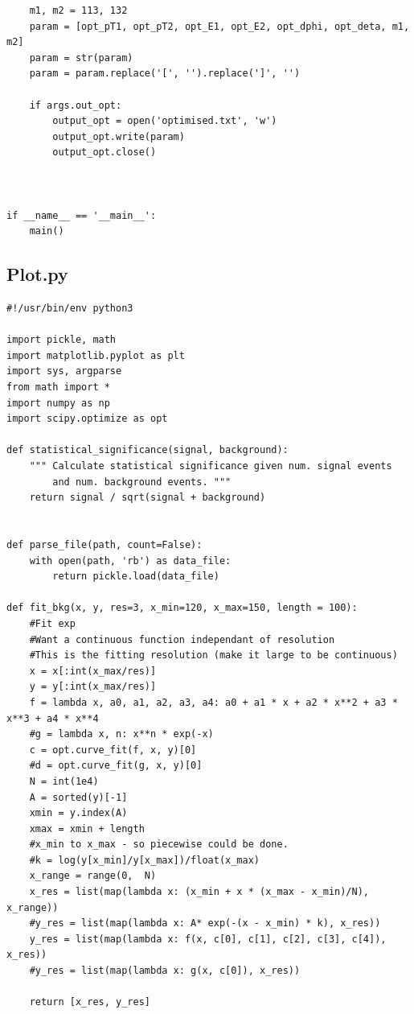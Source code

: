 \documentclass{article}
\begin{document}
\begin{lstlisting}
    m1, m2 = 113, 132
    param = [opt_pT1, opt_pT2, opt_E1, opt_E2, opt_dphi, opt_deta, m1, m2]
    param = str(param)
    param = param.replace('[', '').replace(']', '')

    if args.out_opt:
        output_opt = open('optimised.txt', 'w')
        output_opt.write(param)
        output_opt.close()



if __name__ == '__main__':
    main()

\end{lstlisting}

\subsection{Plot.py}
\begin{lstlisting}
#!/usr/bin/env python3

import pickle, math
import matplotlib.pyplot as plt
import sys, argparse
from math import *
import numpy as np
import scipy.optimize as opt

def statistical_significance(signal, background):
    """ Calculate statistical significance given num. signal events
        and num. background events. """
    return signal / sqrt(signal + background)


def parse_file(path, count=False):
    with open(path, 'rb') as data_file:
        return pickle.load(data_file)

def fit_bkg(x, y, res=3, x_min=120, x_max=150, length = 100):
    #Fit exp
    #Want a continuous function independant of resolution
    #This is the fitting resolution (make it large to be continuous)
    x = x[:int(x_max/res)]
    y = y[:int(x_max/res)]
    f = lambda x, a0, a1, a2, a3, a4: a0 + a1 * x + a2 * x**2 + a3 * x**3 + a4 * x**4
    #g = lambda x, n: x**n * exp(-x)
    c = opt.curve_fit(f, x, y)[0]
    #d = opt.curve_fit(g, x, y)[0]
    N = int(1e4)
    A = sorted(y)[-1]
    xmin = y.index(A)
    xmax = xmin + length
    #x_min to x_max - so piecewise could be done.
    #k = log(y[x_min]/y[x_max])/float(x_max)
    x_range = range(0,  N)
    x_res = list(map(lambda x: (x_min + x * (x_max - x_min)/N), x_range))
    #y_res = list(map(lambda x: A* exp(-(x - x_min) * k), x_res))
    y_res = list(map(lambda x: f(x, c[0], c[1], c[2], c[3], c[4]), x_res))
    #y_res = list(map(lambda x: g(x, c[0]), x_res))

    return [x_res, y_res]


\end{lstlisting}
\end{document}
